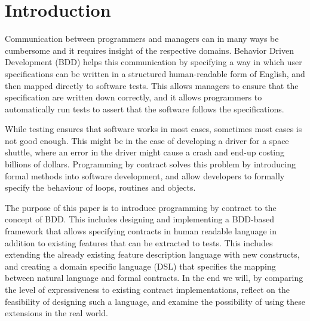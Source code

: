 \section{Introduction} %

Communication between programmers and managers can in many ways be cumbersome and it requires insight of the respective domains. Behavior Driven Development (BDD) \cite{hellesoy2012} helps this communication by specifying a way in which user specifications can be written in a structured human-readable form of English, and then mapped directly to software tests. This allows managers to ensure that the specification are written down correctly, and it allows programmers to automatically run tests to assert that the software follows the specifications. 

While testing ensures that software works in most cases, sometimes most cases is not good enough. This might be in the case of developing a driver for a space shuttle, where an error in the driver might cause a crash and end-up costing billions of dollars.  Programming by contract solves this problem by introducing formal methods into software development, and allow developers to formally specify the behaviour of loops, routines and objects. 

The purpose of this paper is to introduce programming by contract to the concept of BDD. This includes designing and implementing a BDD-based framework that allows specifying contracts in human readable language in addition to existing features that can be extracted to tests. This includes extending the already existing feature description language \cite{hellesoy2012} with new constructs, and creating a domain specific language (DSL) that specifies the mapping between natural language and formal contracts. In the end we will, by comparing the level of expressiveness to existing contract implementations, reflect on the feasibility of designing such a language, and examine the possibility of using these extensions in the real world. 

